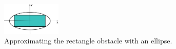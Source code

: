 \documentclass[letterpaper, 10 pt, conference]{ieeeconf}
\begin{document}
	\begin{figure}
		\centering		
		\includegraphics[width=0.25\textwidth]{figures/approx_ellipse}
		\caption{Approximating the rectangle obstacle with an ellipse.}
		\label{fig:approx_ellipse}
	\end{figure}
	
	
	
	\addtolength{\textheight}{-12cm}   %
	
	
	
	
	
\end{document}
